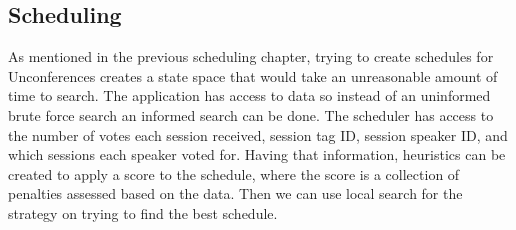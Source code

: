 \subsection{Scheduling}
As mentioned in the previous scheduling chapter, trying to create schedules for Unconferences creates a state space that would take an unreasonable amount of time to search. The application has access to data so instead of an uninformed brute force search an informed search can be done. The scheduler has access to the number of votes each session received, session tag ID, session speaker ID, and which sessions each speaker voted for. Having that information, heuristics can be created to apply a score to the schedule, where the score is a collection of penalties assessed based on the data. Then we can use local search for the strategy on trying to find the best schedule.

